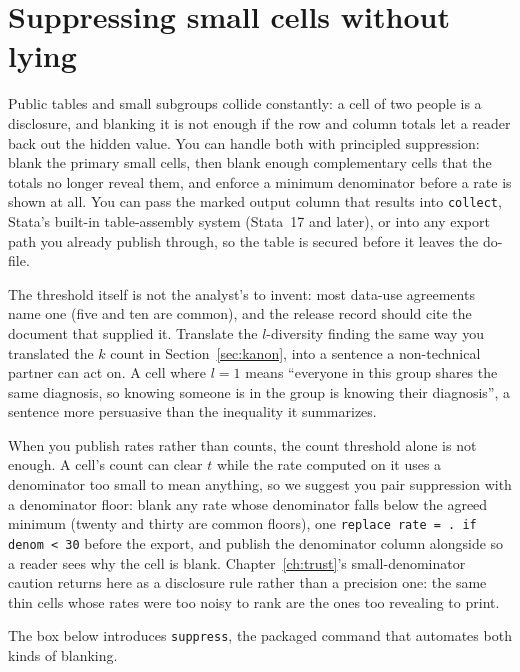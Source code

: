 \documentclass[
    a4paper,
    fontsize=10pt,
    twoside=true,
    numbers=noenddot,
]{kaobook}
\begin{document}
\section{Suppressing small cells without lying}\label{sec:suppress}
Public tables and small subgroups collide constantly: a cell of two people is a disclosure, and blanking it is not enough if the row and column totals let a reader back out the hidden value. You can handle both with principled suppression: blank the primary small cells, then blank enough complementary cells that the totals no longer reveal them, and enforce a minimum denominator before a rate is shown at all. You can pass the marked output column that results into \texttt{collect}, Stata's built-in table-assembly system (Stata~17 and later), or into any export path you already publish through, so the table is secured before it leaves the do-file.

The threshold itself is not the analyst's to invent: most data-use agreements name one (five and ten are common), and the release record should cite the document that supplied it. Translate the $l$-diversity finding the same way you translated the $k$ count in Section~\ref{sec:kanon}, into a sentence a non-technical partner can act on. A cell where $l=1$ means \enquote{everyone in this group shares the same diagnosis, so knowing someone is in the group is knowing their diagnosis}, a sentence more persuasive than the inequality it summarizes.

When you publish rates rather than counts, the count threshold alone is not enough. A cell's count can clear $t$ while the rate computed on it uses a denominator too small to mean anything, so we suggest you pair suppression with a denominator floor: blank any rate whose denominator falls below the agreed minimum (twenty and thirty are common floors), one \texttt{replace rate = . if denom < 30} before the export, and publish the denominator column alongside so a reader sees why the cell is blank. Chapter~\ref{ch:trust}'s small-denominator caution returns here as a disclosure rule rather than a precision one: the same thin cells whose rates were too noisy to rank are the ones too revealing to print.

The box below introduces \texttt{suppress}, the packaged command that automates both kinds of blanking.
\end{document}
